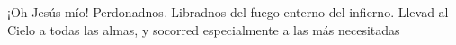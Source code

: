 \documentclass[../devocionario.tex]{subfiles}
\begin{document}
    ¡Oh Jesús mío! Perdonadnos. Libradnos del fuego enterno del infierno. 
    Llevad al Cielo a todas las almas, y socorred especialmente a las más necesitadas
\end{document}
